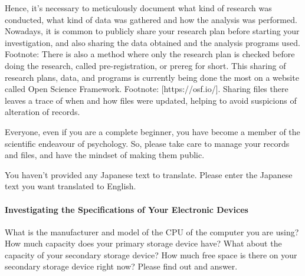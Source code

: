 \documentclass{ltjsbook}
\begin{document}
Hence, it's necessary to meticulously document what kind of research was conducted, what kind of data was gathered and how the analysis was performed. Nowadays, it is common to publicly share your research plan before starting your investigation, and also sharing the data obtained and the analysis programs used. Footnote: There is also a method where only the research plan is checked before doing the research, called pre-registration, or prereg for short. This sharing of research plans, data, and programs is currently being done the most on a website called Open Science Framework. Footnote: [https://osf.io/]. Sharing files there leaves a trace of when and how files were updated, helping to avoid suspicions of alteration of records.

Everyone, even if you are a complete beginner, you have become a member of the scientific endeavour of psychology. So, please take care to manage your records and files, and have the mindset of making them public.

You haven't provided any Japanese text to translate. Please enter the Japanese text you want translated to English.
\paragraph{Investigating the Specifications of Your Electronic Devices}
What is the manufacturer and model of the CPU of the computer you are using? How much capacity does your primary storage device have? What about the capacity of your secondary storage device? How much free space is there on your secondary storage device right now? Please find out and answer.
\end{document}
